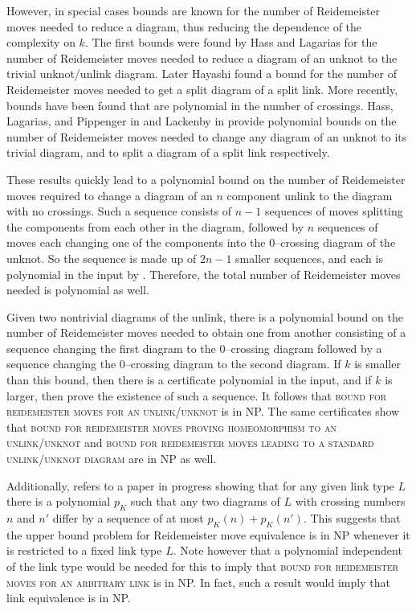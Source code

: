 \documentclass[12pt]{amsart}
\theoremstyle{definition}
\theoremstyle{remark}
\begin{document}
However, in special cases bounds are known for the number of Reidemeister moves needed to reduce a diagram, thus reducing the dependence of the complexity on $k$.
The first bounds were found by Hass and Lagarias \cite{HassLagarias1} for the number of Reidemeister moves needed to reduce a diagram of an unknot to the trivial unknot/unlink diagram.
Later Hayashi \cite{Hayashi1} found a bound for the number of Reidemeister moves needed to get a split diagram of a split link.
More recently, bounds have been found that are polynomial in the number of crossings.
Hass, Lagarias, and Pippenger in \cite{HassLagariasPippenger1} and Lackenby in \cite{Lackenby2} provide polynomial bounds on the number of Reidemeister moves needed to change any diagram of an unknot to its trivial diagram, and to split a diagram of a split link respectively.

These results quickly lead to a polynomial bound on the number of Reidemeister moves required to change a diagram of an $n$ component unlink to the diagram with no crossings.
Such a sequence consists of $n-1$ sequences of moves splitting the components from each other in the diagram, followed by $n$ sequences of moves each changing one of the components into the 0--crossing diagram of the unknot.
So the sequence is made up of $2n-1$ smaller sequences, and each is polynomial in the input by \cite{HassLagariasPippenger1,Lackenby2}.
Therefore, the total number of Reidemeister moves needed is polynomial as well.

Given two nontrivial diagrams of the unlink, there is a polynomial bound on the number of Reidemeister moves needed to obtain one from another consisting of a sequence changing the first diagram to the 0--crossing diagram followed by a sequence changing the 0--crossing diagram to the second diagram.
If $k$ is smaller than this bound, then there is a certificate polynomial in the input, and if $k$ is larger, then \cite{HassLagariasPippenger1,Lackenby2} prove the existence of such a sequence.
It follows that \textsc{bound for reidemeister moves for an unlink/unknot} is in NP.
The same certificates show that \textsc{bound for reidemeister moves proving homeomorphism to an unlink/unknot} and \textsc{bound for reidemeister moves leading to a standard unlink/unknot diagram} are in NP as well.

Additionally, \cite{Lackenby3} refers to a paper in progress \cite{Lackenby4} showing that for any given link type $L$ there is a polynomial $p_K$ such that any
two diagrams of $L$ with crossing numbers $n$ and $n'$ differ by a sequence of at most $p_K(n) + p_K(n')$.
This suggests that the upper bound problem for Reidemeister move equivalence is in NP whenever it is restricted to a fixed link type $L$.
Note however that a polynomial independent of the link type would be needed for this to imply that \textsc{bound for reidemeister moves for an arbitrary link} is in NP.
In fact, such a result would imply that link equivalence is in NP.
\end{document}
